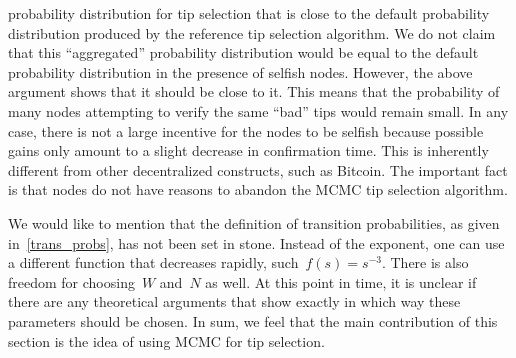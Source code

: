 \documentclass[12pt]{article}
\begin{document}
\begin{CJK}{UTF8}{bkai}
probability distribution for tip selection that is close to
 the default probability distribution produced
by the reference tip selection algorithm.
We do not claim that this ``aggregated'' probability
distribution
would be equal to the default probability distribution in the presence of selfish nodes. 
However, the above argument shows that it should be close to it.
This means that the probability of many nodes attempting 
to verify the same ``bad'' tips would remain small. 
In any case, 
there is not a large incentive for the nodes to be selfish 
because possible gains only amount to a slight decrease 
in confirmation time. This is inherently different from other 
decentralized constructs, such as Bitcoin. The important 
fact is that nodes do not have reasons to abandon the
 MCMC tip selection algorithm.


We would like to mention that the definition of transition 
probabilities, as given in~\eqref{trans_probs}, has not been 
set in stone.
Instead of the exponent, one can use a different function 
that decreases rapidly, such~$f(s)=s^{-3}$. 
There is also freedom for choosing~$W$ and~$N$ as well.
At this point in time, it is unclear if there are any theoretical 
arguments that show exactly in which way these parameters 
should be chosen. In sum, we feel that the main contribution 
of this section is the idea of using MCMC for tip selection.


\end{CJK}
\end{document}
